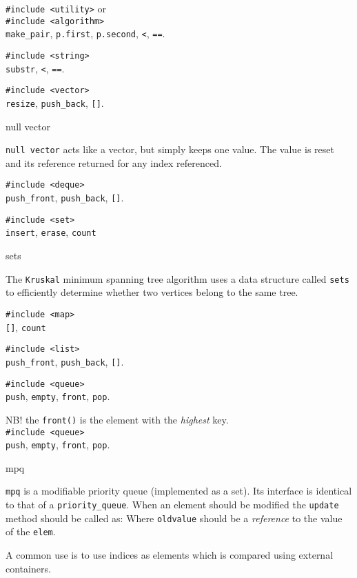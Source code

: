 \categorycontents{}
\newpage

{\tt \#include <utility>} or\\
{\tt \#include <algorithm>}\\
{\tt make\_pair}, {\tt p.first}, {\tt p.second}, {\tt <}, {\tt ==}.


{\tt \#include <string>}\\
{\tt substr}, {\tt <}, {\tt ==}.


{\tt \#include <vector>}\\
{\tt resize}, {\tt push\_back}, {\tt []}.
\begin{algorithm}{null vector}

{\tt null vector} acts like a vector, but simply keeps one value.
The value is reset and its reference returned for any index referenced.
\end{algorithm}


{\tt \#include <deque>}\\
{\tt push\_front}, {\tt push\_back}, {\tt []}.


{\tt \#include <set>}\\
{\tt insert}, {\tt erase}, {\tt count}
\begin{algorithm}{sets}

The {\tt Kruskal} minimum spanning tree algorithm uses a data structure
called {\tt sets} to efficiently determine whether two vertices belong to
the same tree.
\end{algorithm}


{\tt \#include <map>}\\
{\tt []}, {\tt count}


{\tt \#include <list>}\\
{\tt push\_front}, {\tt push\_back}, {\tt []}.


{\tt \#include <queue>}\\
{\tt push}, {\tt empty}, {\tt front}, {\tt pop}.

NB! the {\tt front()} is the element with the {\em highest} key.\\
{\tt \#include <queue>}\\
{\tt push}, {\tt empty}, {\tt front}, {\tt pop}.
\begin{algorithm}{mpq}

{\tt mpq} is a modifiable priority queue (implemented as a set). Its interface
is identical to that of a {\tt priority\_queue}. When an element should be
modified the {\tt update} method should be called as:
Where {\tt oldvalue} should be a \emph{reference} to the value of the
{\tt elem}.

A common use is to use indices as elements which is compared using external
containers.
\end{algorithm}

